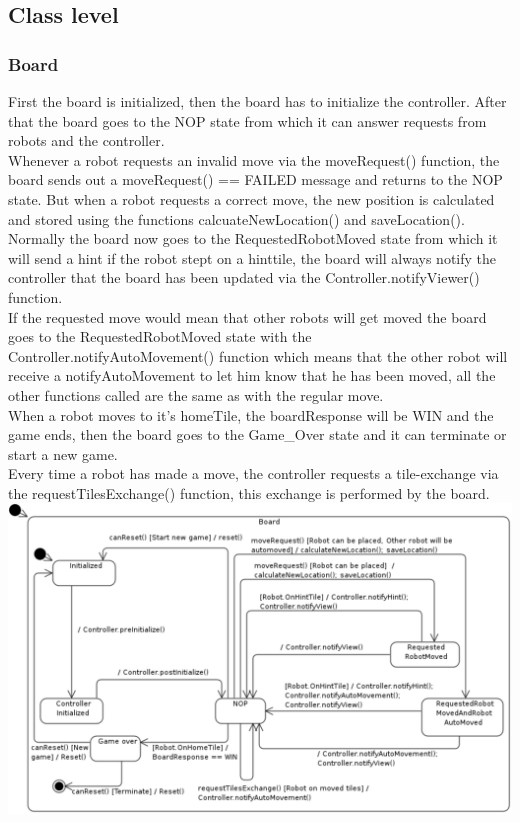 \subsection{Class level}
	\subsubsection{Board}
	First the board is initialized, then the board has to initialize the controller. After that the board goes to the NOP state from which it can answer requests from robots and the controller. \\
Whenever a robot requests an invalid move via the moveRequest() function, the board sends out a moveRequest() == FAILED message and returns to the NOP state. But when a robot requests a correct move, the new position is calculated and stored using the functions calcuateNewLocation() and saveLocation(). \\
Normally the board now goes to the RequestedRobotMoved state from which it will send a hint if the robot stept on a hinttile, the board will always notify the controller that the board has been updated via the Controller.notifyViewer() function.\\
If the requested move would mean that other robots will get moved the board goes to the RequestedRobotMoved state with the Controller.notifyAutoMovement() function which means that the other robot will receive a notifyAutoMovement to let him know that he has been moved, all the other functions called are the same as with the regular move.\\
When a robot moves to it's homeTile, the boardResponse will be WIN and the game ends, then the board goes to the Game\_Over state and it can terminate or start a new game.\\
Every time a robot has made a move, the controller requests a tile-exchange via the requestTilesExchange() function, this exchange is performed by the board.\\
	
	\includegraphics[width=\linewidth]{statecharts/board.pdf}

